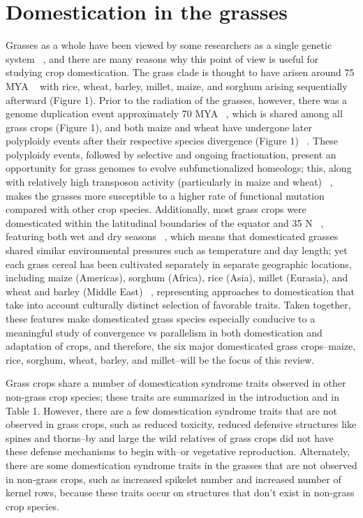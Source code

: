 \documentclass[12pt]{article}
\begin{document}
\section*{Domestication in the grasses}
Grasses as a whole have been viewed by some researchers as a single genetic system ~\citep{pmid8379002, pmid11244100}, and there are many reasons why this point of view is useful for studying crop domestication.  The grass clade is thought to have arisen around 75 MYA ~\citep{BOUCHENAKKHELLADI2010, Kellogg2001} with rice, wheat, barley, millet, maize, and sorghum arising sequentially afterward (Figure 1). Prior to the radiation of the grasses, however, there was a genome duplication event approximately 70 MYA ~\citep{Paterson2004}, which is shared among all grass crops (Figure 1), and both maize and wheat have undergone later polyploidy events after their respective species divergence (Figure 1) ~\citep{Levy2002}. These polyploidy events, followed by selective and ongoing fractionation, present an opportunity for grass genomes to evolve subfunctionalized homeologs; this, along with relatively high transposon activity (particularly in maize and wheat) ~\citep{Wicker2016, Lisch2001}, makes the grasses more susceptible to a higher rate of functional mutation compared with other crop species.  Additionally, most grass crops were domesticated within the latitudinal boundaries of the equator and 35 N ~\citep{Jain1993, Gepts2010}, featuring both wet and dry seasons ~\citep{Jain1993}, which means that domesticated grasses shared similar environmental pressures such as temperature and day length; yet each grass cereal has been cultivated separately in separate geographic locations, including maize (Americas), sorghum (Africa), rice (Asia), millet (Eurasia), and wheat and barley (Middle East) ~\citep{Glmin2009}, representing approaches to domestication that take into account culturally distinct selection of favorable traits. Taken together, these features make domesticated grass species especially conducive to a meaningful study of convergence vs parallelism in both domestication and adaptation of crops, and therefore, the six major domesticated grass crops--maize, rice, sorghum, wheat, barley, and millet--will be the focus of this review. 

Grass crops share a number of domestication syndrome traits observed in other non-grass crop species; these traits are summarized in the introduction and in Table 1.  However, there are a few domestication syndrome traits that are not observed in grass crops, such as reduced toxicity, reduced defensive structures like spines and thorns--by and large the wild relatives of grass crops did not have these defense mechanisms to begin with--or vegetative reproduction. Alternately, there are some domestication syndrome traits in the grasses that are not observed in non-grass crops, such as increased spikelet number and increased number of kernel rows, because these traits occur on structures that don’t exist in non-grass crop species.  
\end{document}
